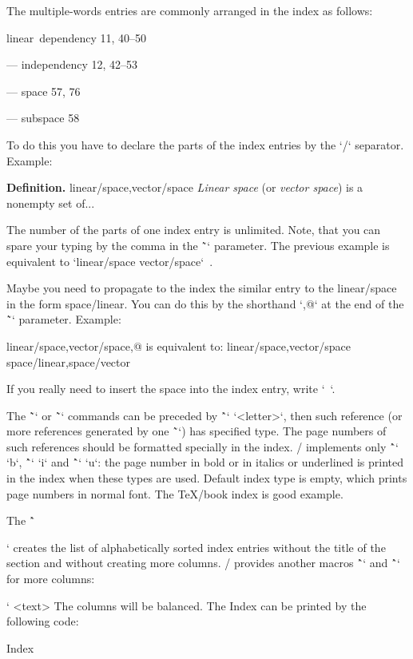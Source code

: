 {The multiple-words entries are commonly arranged in the index as follows:

\medskip

linear~dependency  11, 40--50

--- independency 12, 42--53

--- space 57, 76

--- subspace 58

\medskip

To do this you have to declare the parts of the index entries by the `/` separator.
Example:

\begtt
{\bf Definition.}
\ii linear/space,vector/space
{\em Linear space} (or {\em vector space}) is a nonempty set of...
\endtt

The number of the parts of one index entry is unlimited. Note, that you can
spare your typing by the comma in the \~`\ii` parameter. The previous example
is equivalent to `\ii linear/space \ii vector/space`~.

Maybe you need to propagate to the index the similar entry to the
linear/space in the form space/linear. You can do this by the shorthand `,@`
at the end of the \~`\ii` parameter. Example:

\begtt
\ii linear/space,vector/space,@
is equivalent to:
\ii linear/space,vector/space \ii space/linear,space/vector
\endtt

If you really need to insert the space into the index entry, write `~`.

The \~`\ii` or \~`\iid` commands can be preceded by \^`\iitype` `<letter>`, then such
reference (or more references generated by one \~`\ii`) has specified type.
The page numbers of such references should be formatted
specially in the index. \OpTeX/ implements only \^`\iitype` `b`, 
\^`\iitype` `i` and \^`\iitype` `u`: 
the page number in bold or in italics or underlined is printed
in the index when these types are used. Default index type is empty, which
prints page numbers in normal font. The \TeX/book index is good example.

The \^`\makeindex` creates the list of alphabetically sorted index entries
without the title of the section and without creating more columns. \OpTeX/
provides another macros \^`\begmulti` and \^`\endmulti` for more columns: 

\begtt \catcode`
<text>
\endmulti
\endtt
The columns will be balanced. The Index can be printed by the following
code:

\begtt
\sec Index
 \makeindex \endmulti
\endtt

}
